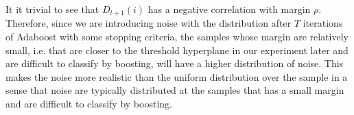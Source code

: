 It it trivial to see that $D_{t+1}(i)$ has a negative correlation with margin $\rho$.
Therefore, since we are introducing noise with the distribution after $T$ iterations of Adaboost with some stopping criteria,
the samples whose margin are relatively small, i.e. that are closer to the threshold hyperplane in our experiment later and
are difficult to classify by boosting, will have a higher distribution of noise.
This makes the noise more realistic than the uniform distribution over the sample in a sense that
noise are typically distributed at the samples that has a small margin and are difficult to classify by boosting.
